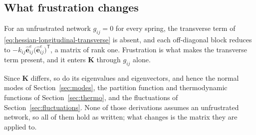 \documentclass[11pt]{article}
\newcommand{\ee}{\hat{\mathbf{e}}}
\newcommand{\KK}{\mathbf{K}}
\newcommand{\eeije}{\ee^{e}_{ij}}
\newcommand{\gij}{g_{ij}}
\newcommand{\kij}{k_{ij}}
\begin{document}
\subsection*{What frustration changes}

For an unfrustrated network $\gij = 0$ for every spring, the transverse term of
\eqref{eq:hessian-longitudinal-transverse} is absent, and each off-diagonal block
reduces to $-\kij\eeije\big(\eeije\big)^{\mathsf T}$, a matrix of rank one.
Frustration is what makes the transverse term present, and it enters $\KK$ through
$\gij$ alone.

Since $\KK$ differs, so do its eigenvalues and eigenvectors, and hence the normal
modes of Section~\ref{sec:modes}, the partition function and thermodynamic
functions of Section~\ref{sec:thermo}, and the fluctuations of
Section~\ref{sec:fluctuations}. None of those derivations assumes an unfrustrated
network, so all of them hold as written; what changes is the matrix they are
applied to.
\end{document}
